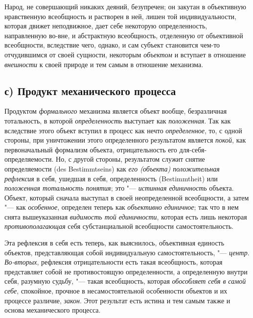 Народ, не совершающий никаких деяний, безупречен; он закутан
в объективную нравственную всеобщность и растворен в ней, лишен той
индивидуальности, которая движет неподвижное, дает себе некоторую
определенность, направленную во-вне, и абстрактную всеобщность, отделенную
от объективной всеобщности, вследствие чего, однако, и сам субъект
становится чем-то отчудившимся от своей сущности, некоторым
{\em объектом} и вступает
в отношение {\em внешности}
к своей природе и тем самым в отношение механизма.

\subsection[с) Продукт механического процесса]{с) Продукт механического процесса}
Продуктом
{\em формального}
механизма является объект вообще, безразличная тотальность, в
которой {\em определенность}
выступает как
{\em положенная}. Так как
вследствие этого объект вступил в процесс как нечто
{\em определенное}, то, с
одной стороны, при уничтожении этого определенного результатом является
{\em покой}, как
первоначальный формализм объекта, отрицательность его
для-себя-определяемости. Но, с другой стороны,
результатом служит
снятие
определяемости (des Bestimmtseins) как
{\em его (объекта) положительная
рефлексия} в себя, ушедшая в себя, определенность
(Bestimmtheit) или {\em положенная
тотальность понятия}; это
"--- {\em истинная единичность
}объекта. Объект, который сначала выступал в
своей неопределенной всеобщности, а затем "--- как
{\em особенное},
определен теперь как
{\em объективно единичное};
так что в нем снята вышеуказанная
{\em видимость той единичности},
которая есть лишь некоторая
{\em противополагающая}
себя субстанциальной всеобщности самостоятельность.

Эта рефлексия в себя есть теперь, как выяснилось, объективная
единость объектов, представляющая собой индивидуальную самостоятельность,
"--- {\em центр}.
{\em Во-вторых},
рефлексия отрицательности есть такая всеобщность, которая
представляет собой не противостоящую определенности, а определенную внутри
себя, разумную судьбу, "--- такая всеобщность, которая
{\em обособляет себя в
}{\em самой себе},
спокойное, прочное в несамостоятельной особенности объектов и
их процессе различие, {\em закон}.
Этот результат есть истина и тем самым также и основа
механического процесса.

